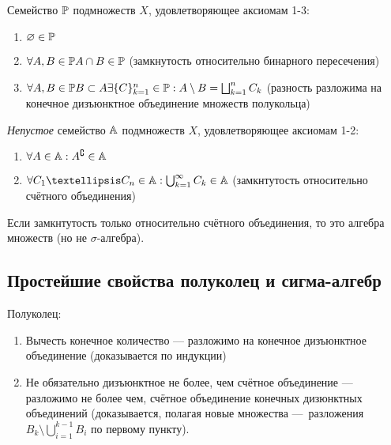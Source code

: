 \documentclass[12pt, a4paper, oneside]{memoir}
\begin{document}
\begin{definition}

    Семейство ${\mathbb{P}}$ подмножеств $X$, удовлетворяющее аксиомам 1-3:

    \begin{enumerate}
        \item $\varnothing \in {\mathbb{P}}$
        \item $\forall A, B \in {\mathbb{P}} A \cap B \in {\mathbb{P}}$ (замкнутость относительно бинарного пересечения)
        \item $\forall A, B \in {\mathbb{P}} B \subset A \exists \{ C \}_{k = 1}^n \in {\mathbb{P}}: A \setminus B = \bigsqcup_{k = 1}^n C_k$
        (разность разложима на конечное дизъюнктное объединение множеств полукольца)
    \end{enumerate}
\end{definition}

\begin{definition}

    \textit{Непустое} семейство ${\mathbb{A}}$ подмножеств $X$, удовлетворяющее аксиомам 1-2:

    \begin{enumerate}
        \item $\forall A \in {\mathbb{A}}: A^{\complement} \in {\mathbb{A}}$
        \item $\forall C_1 … C_n \in \sA: \bigcup_{k = 1}^\infty C_k \in \sA$ (замкнтутость относительно счётного объединения)
    \end{enumerate}
\end{definition}

\begin{remark}
    Если замкнтутость только относительно счётного объединения, то это алгебра множеств (но не $\sigma$-алгебра).
\end{remark}


\subsection{Простейшие свойства полуколец и сигма-алгебр}

Полуколец:
\begin{enumerate}
    \item Вычесть конечное количество — разложимо на конечное дизъюнктное объединение (доказывается по индукции)
    \item Не обязательно дизъюнктное не более, чем счётное объединение — 
    разложимо не более чем, счётное объединение конечных дизюнктных объединений 
    (доказывается, полагая новые множества — разложения $B_k \setminus \bigcup_{i = 1}^{k - 1} B_i$ по первому пункту).
\end{enumerate}
\end{document}
